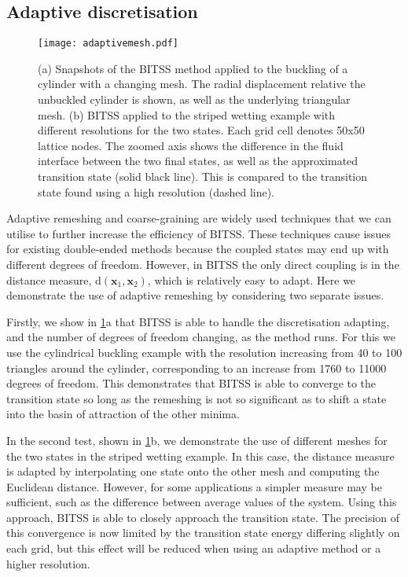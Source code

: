 \documentclass[twocolumn,10pt]{revtex4}
\begin{document}
\subsection{Adaptive discretisation}\label{sec:adaptive}
\begin{figure}[tb]
  \texttt{[image: adaptivemesh.pdf]}
  \caption{\label{fig:adaptivemesh}
    (a) Snapshots of the BITSS method applied to the buckling of a cylinder with a changing mesh.
        The radial displacement relative the unbuckled cylinder is shown, as well as the underlying triangular mesh.
    (b) BITSS applied to the striped wetting example with different resolutions for the two states.
        Each grid cell denotes 50x50 lattice nodes.
        The zoomed axis shows the difference in the fluid interface between the two final states, as well as the approximated transition state (solid black line).
        This is compared to the transition state found using a high resolution (dashed line).
  }
\end{figure}

Adaptive remeshing and coarse-graining are widely used techniques that we can utilise to further increase the efficiency of BITSS.
These techniques cause issues for existing double-ended methods because the coupled states may end up with different degrees of freedom.
However, in BITSS the only direct coupling is in the distance measure, $\mathrm{d}(\bm{x}_1,\bm{x}_2)$, which is relatively easy to adapt.
Here we demonstrate the use of adaptive remeshing by considering two separate issues.

Firstly, we show in \cref{fig:adaptivemesh}a that BITSS is able to handle the discretisation adapting, and the number of degrees of freedom changing, as the method runs.
For this we use the cylindrical buckling example with the resolution increasing from 40 to 100 triangles around the cylinder, corresponding to an increase from \num{1760} to \num{11000} degrees of freedom.
This demonstrates that BITSS is able to converge to the transition state so long as the remeshing is not so significant as to shift a state into the basin of attraction of the other minima.

In the second test, shown in \cref{fig:adaptivemesh}b, we demonstrate the use of different meshes for the two states in the striped wetting example.
In this case, the distance measure is adapted by interpolating one state onto the other mesh and computing the Euclidean distance.
However, for some applications a simpler measure may be sufficient, such as the difference between average values of the system.
Using this approach, BITSS is able to closely approach the transition state.
The precision of this convergence is now limited by the transition state energy differing slightly on each grid, but this effect will be reduced when using an adaptive method or a higher resolution.
\end{document}
